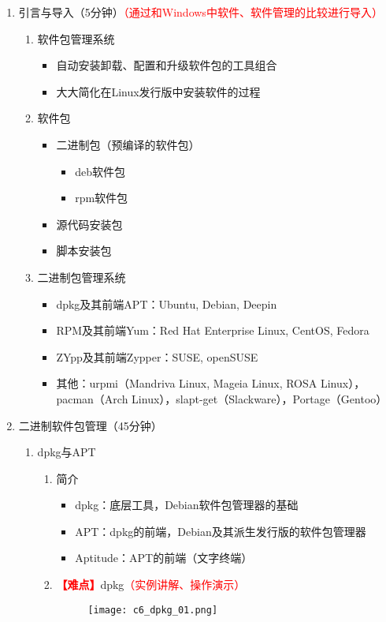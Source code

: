 \documentclass{TIJMUjiaoanLL}
\begin{document}
\begin{enumerate}
  \item
    引言与导入（5分钟）\textcolor{red}{（通过和Windows中软件、软件管理的比较进行导入）}
    \begin{enumerate}
      \item 软件包管理系统
	\begin{itemize}
	  \item 自动安装卸载、配置和升级软件包的工具组合
	  \item 大大简化在Linux发行版中安装软件的过程
	\end{itemize}
      \item 软件包
	\begin{itemize}
	  \item 二进制包（预编译的软件包）
	    \begin{itemize}
	      \item deb软件包
	      \item rpm软件包
	    \end{itemize}
	  \item 源代码安装包
	  \item 脚本安装包
	\end{itemize}
      \item 二进制包管理系统
	\begin{itemize}
          \item dpkg及其前端APT：Ubuntu, Debian, Deepin
          \item RPM及其前端Yum：Red Hat Enterprise Linux, CentOS, Fedora
          \item ZYpp及其前端Zypper：SUSE, openSUSE
          \item 其他：urpmi（Mandriva Linux, Mageia Linux, ROSA Linux），pacman（Arch Linux），slapt-get（Slackware），Portage（Gentoo）
	\end{itemize}
    \end{enumerate}

  \item 二进制软件包管理（45分钟）
    \begin{enumerate}
      \item dpkg与APT
	\begin{enumerate}
	  \item 简介
	    \begin{itemize}
	      \item dpkg：底层工具，Debian软件包管理器的基础
	      \item APT：dpkg的前端，Debian及其派生发行版的软件包管理器
	      \item Aptitude：APT的前端（文字终端）
	    \end{itemize}
	  \item \textcolor{red}{\textbf{【难点】}}dpkg\textcolor{red}{（实例讲解、操作演示）}
	    \vspace*{-10pt}
	    \begin{figure}[h]
	      \centering
	      \texttt{[image: c6\_dpkg\_01.png]}
	    \end{figure}
	    \vspace*{-10pt}


\end{enumerate}
\end{enumerate}
\end{enumerate}
\end{document}
